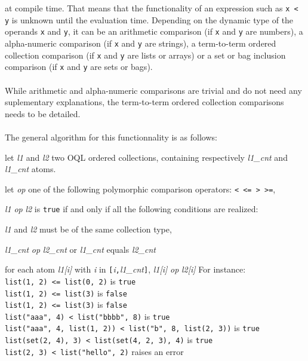 at compile time. That means that the functionality of an expression such as
\texttt{x < y} is unknown until the evaluation time. Depending on the
dynamic type of the operands \texttt{x} and \texttt{y}, it can be an
arithmetic comparison (if \texttt{x} and \texttt{y} are numbers),
a alpha-numeric comparison (if \texttt{x} and \texttt{y} are strings),
a term-to-term ordered collection comparison (if \texttt{x} and \texttt{y} are lists or
arrays) or a set or bag inclusion comparison
(if \texttt{x} and \texttt{y} are sets or bags).
\\
\\
While arithmetic and alpha-numeric comparisons are trivial and do not
need any suplementary explanations,
the term-to-term ordered collection comparisons needs to be detailed.
\\
\\
The general algorithm for this functionnality is as follows:\\
\be
\item let \emph{l1} and \emph{l2} two OQL ordered collections, containing
respectively \emph{l1\_cnt} and \emph{l1\_cnt} atoms.
\item let \emph{op} one of the following polymorphic comparison operators: 
 \texttt{< <= > >=},
\item \emph{l1} \emph{op} \emph{l2} is \texttt{true} if and only if all the
following conditions are realized:
\be
\item \emph{l1} and \emph{l2} must be of the same collection type,
\item \emph{l1\_cnt} \emph{op} \emph{l2\_cnt} or \emph{l1\_cnt} equals
\emph{l2\_cnt}
\item for each atom \emph{l1[i]} with \emph{i} in \texttt{[}\emph{i}\texttt{,}\emph{l1\_cnt}\texttt{]}, \emph{l1[i]} \emph{op} \emph{l2[i]}
\ee
\ee
For instance:\\
\texttt{list(1, 2) <= list(0, 2)} is \texttt{true}\\
\texttt{list(1, 2) <= list(3)} is \texttt{false}\\
\texttt{list(1, 2) <= list(3)} is \texttt{false}\\
\texttt{list("aaa", 4) < list("bbbb", 8)} is \texttt{true}\\
\texttt{list("aaa", 4, list(1, 2)) < list("b", 8, list(2, 3))} is \texttt{true}\\
\texttt{list(set(2, 4), 3) < list(set(4, 2, 3), 4)} is \texttt{true}\\
\texttt{list(2, 3) < list("hello", 2)} raises an error\\
